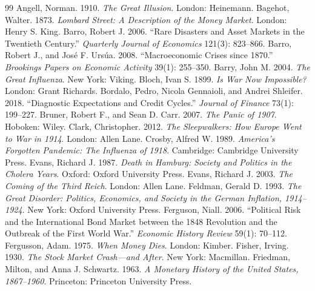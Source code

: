\documentclass[11pt]{article}
\begin{document}
\begin{thebibliography}{99}
 Angell, Norman. 1910. \emph{The Great Illusion}. London: Heinemann.
 Bagehot, Walter. 1873. \emph{Lombard Street: A Description of the Money
Market}. London: Henry S. King.
 Barro, Robert J. 2006. ``Rare Disasters and Asset Markets in the Twentieth
Century.'' \emph{Quarterly Journal of Economics} 121(3): 823--866.
 Barro, Robert J., and Jos\'e F. Urs\'ua. 2008.
``Macroeconomic Crises since 1870.'' \emph{Brookings Papers on Economic Activity} 39(1): 255--350.
 Barry, John M. 2004. \emph{The Great Influenza}. New York: Viking.
 Bloch, Ivan S. 1899. \emph{Is War Now Impossible?} London: Grant Richards.
 Bordalo, Pedro, Nicola Gennaioli, and Andrei Shleifer. 2018.
``Diagnostic Expectations and Credit Cycles.'' \emph{Journal of Finance} 73(1): 199--227.
 Bruner, Robert F., and Sean D. Carr. 2007. \emph{The Panic of
1907}. Hoboken: Wiley.
 Clark, Christopher. 2012. \emph{The Sleepwalkers: How Europe Went to War in
1914}. London: Allen Lane.
 Crosby, Alfred W. 1989. \emph{America's Forgotten Pandemic: The Influenza
of 1918}. Cambridge: Cambridge University Press.
 Evans, Richard J. 1987. \emph{Death in Hamburg: Society and Politics in the
Cholera Years}. Oxford: Oxford University Press.
 Evans, Richard J. 2003. \emph{The Coming of the Third Reich}. London: Allen
Lane.
 Feldman, Gerald D. 1993. \emph{The Great Disorder: Politics, Economics,
and Society in the German Inflation, 1914--1924}. New York: Oxford University Press.
 Ferguson, Niall. 2006. ``Political Risk and the International Bond
Market between the 1848 Revolution and the Outbreak of the First World War.'' \emph{Economic History Review}
59(1): 70--112.
 Fergusson, Adam. 1975. \emph{When Money Dies}. London: Kimber.
 Fisher, Irving. 1930. \emph{The Stock Market Crash---and After}. New
York: Macmillan.
 Friedman, Milton, and Anna J. Schwartz. 1963. \emph{A
Monetary History of the United States, 1867--1960}. Princeton: Princeton University Press.

\end{thebibliography}
\end{document}
